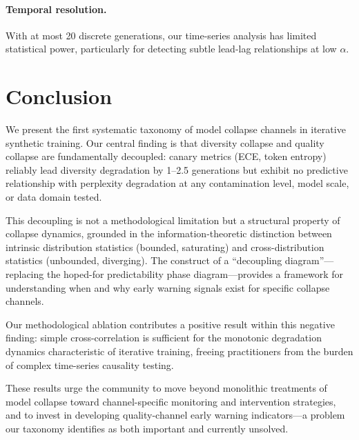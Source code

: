 \documentclass[letterpaper,11pt]{article}
\begin{document}
\paragraph{Temporal resolution.} With at most 20 discrete generations, our time-series analysis has limited statistical power, particularly for detecting subtle lead-lag relationships at low $\alpha$.

\section{Conclusion}

We present the first systematic taxonomy of model collapse channels in iterative synthetic training.
Our central finding is that diversity collapse and quality collapse are fundamentally decoupled: canary metrics (ECE, token entropy) reliably lead diversity degradation by 1--2.5 generations but exhibit no predictive relationship with perplexity degradation at any contamination level, model scale, or data domain tested.

This decoupling is not a methodological limitation but a structural property of collapse dynamics, grounded in the information-theoretic distinction between intrinsic distribution statistics (bounded, saturating) and cross-distribution statistics (unbounded, diverging).
The construct of a ``decoupling diagram''---replacing the hoped-for predictability phase diagram---provides a framework for understanding when and why early warning signals exist for specific collapse channels.

Our methodological ablation contributes a positive result within this negative finding: simple cross-correlation is sufficient for the monotonic degradation dynamics characteristic of iterative training, freeing practitioners from the burden of complex time-series causality testing.

These results urge the community to move beyond monolithic treatments of model collapse toward channel-specific monitoring and intervention strategies, and to invest in developing quality-channel early warning indicators---a problem our taxonomy identifies as both important and currently unsolved.
\end{document}

